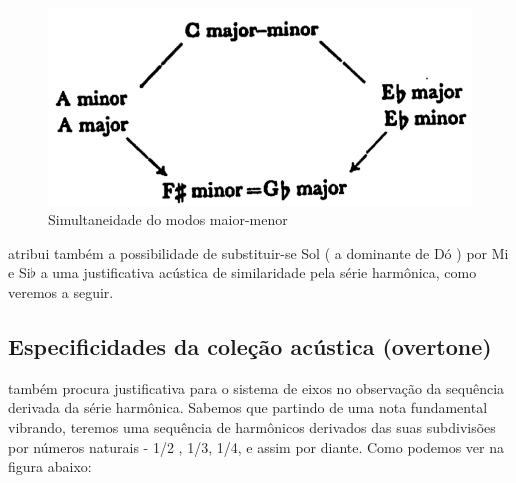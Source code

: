 \documentclass[
	12pt,				%
	openright,			%
	twoside,			%
	a4paper,			%
	english,			%
	french,				%
	spanish,			%
	brazil				%
	]{abntex2}
\begin{document}
\begin{figure}[!h]
	\caption{\label{fig_grafico}Simultaneidade do modos maior-menor }
	\begin{center}
	    \includegraphics[scale=0.3]{axis/maiormenor.png}
	\end{center}
\end{figure}

 atribui também a possibilidade de substituir-se Sol ( a dominante de Dó ) por Mi e Si$\flat$ a uma justificativa acústica de similaridade pela série harmônica, como veremos a seguir. 



\subsection{Especificidades da coleção acústica (overtone)}

 também procura  justificativa para o sistema de eixos no observação da sequência derivada da série harmônica. Sabemos que partindo de uma nota fundamental vibrando, teremos uma sequência de harmônicos derivados das suas subdivisões por números naturais - 1/2 , 1/3, 1/4, e assim por diante. Como podemos ver na figura abaixo:
\end{document}
